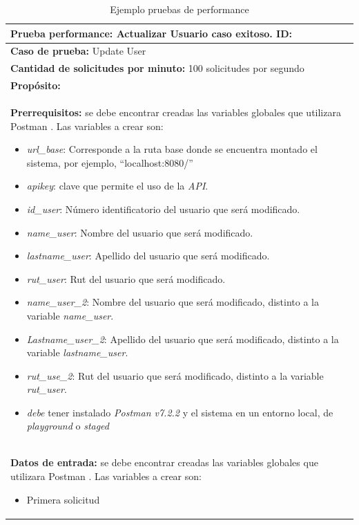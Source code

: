 \begin{table}[H]
    \caption[Ejemplo pruebas de performance] {Ejemplo pruebas de performance}
    \label{tbl:ejemplo pruebas de performance}
    \begin{tabular}{|p{}|}
        \hline
        \textbf{Prueba performance: Actualizar Usuario caso exitoso.  \hfill ID: } \\
    	\hline
    	\hline
    	\textbf{Caso de prueba:} Update User\\ \hline
    	\textbf{Cantidad de solicitudes por minuto:} 100 solicitudes por segundo \\ \hline
    	\textbf{Propósito:} \\ \hline
    	\textbf{Prerrequisitos: }
		se debe encontrar creadas las variables globales que utilizara Postman . Las variables a crear son:
		\begin{itemize}
			\item \textit{url\_base}: Corresponde a la ruta base donde se encuentra montado el sistema, por ejemplo, “localhost:8080/”
			\item \textit{apikey}: clave que permite el uso de la \textit{API}. 
			\item \textit{id\_user}: Número identificatorio del usuario que será modificado.
			\item \textit{name\_user}: Nombre del usuario que será modificado. 
			\item \textit{lastname\_user}: Apellido del usuario que será modificado.
			\item \textit{rut\_user}: Rut del usuario que será modificado.
			\item \textit{name\_user\_2}: Nombre del usuario que será modificado, distinto a la variable \textit{name\_user}.
			\item \textit{Lastname\_user\_2}: Apellido del usuario que será modificado, distinto a la variable \textit{lastname\_user}.
			\item \textit{rut\_use\_2}: Rut del usuario que será modificado, distinto a la variable \textit{rut\_user}.
			\item \textit{debe} tener instalado \textit{Postman v7.2.2} y el sistema en un entorno local, de \textit{playground} o \textit{staged}
		\end{itemize} \\ \hline
		\textbf{Datos de entrada: }
		se debe encontrar creadas las variables globales que utilizara Postman . Las variables a crear son:
		\begin{itemize}
			\item Primera solicitud

\end{itemize}
\end{tabular}
\end{table}

